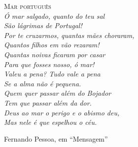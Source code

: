 {\noindent\LARGE\textsc{Mar português}} \\

{ \it
\noindent{}Ó mar salgado, quanto do teu sal \\
São lágrimas de Portugal! \\
Por te cruzarmos, quantas mães choraram, \\
Quantos filhos em vão rezaram! \\
Quantas noivas ficaram por casar \\
Para que fosses nosso, ó mar! \\

\noindent{}Valeu a pena? Tudo vale a pena \\
Se a alma não é pequena. \\
Quem quer passar além do Bojador \\
Tem que passar além da dor. \\
Deus ao mar o perigo e o abismo deu, \\
Mas nele é que espelhou o céu. \\
}

\noindent{}Fernando Pessoa, em ``Mensagem''

\thispagestyle{empty}
\clearpage

